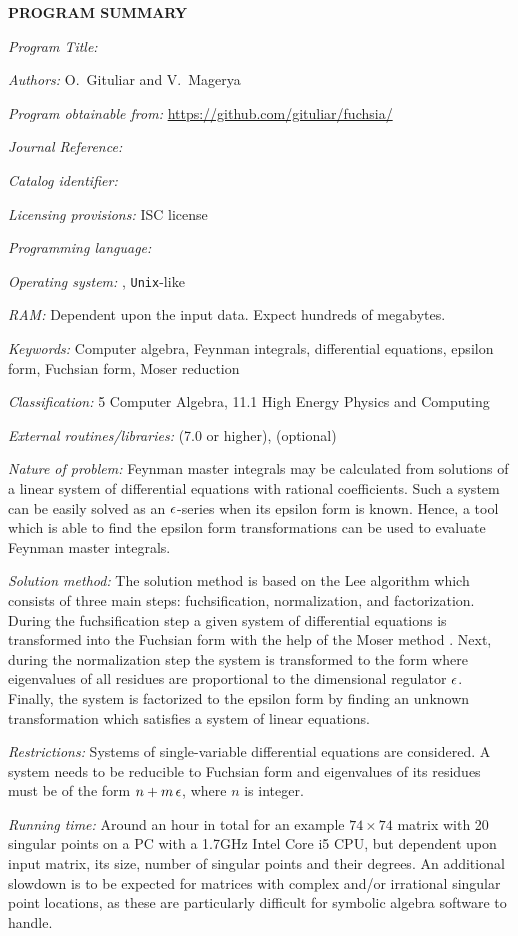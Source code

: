 {\bf PROGRAM SUMMARY}

\begin{small}
\noindent

{\em Program Title:}
    \fuchsia

{\em Authors:}
    O.~Gituliar and V.~Magerya

{\em Program obtainable from:}
    \url{https://github.com/gituliar/fuchsia/}

{\em Journal Reference:}

{\em Catalog identifier:}

{\em Licensing provisions:}
    ISC license

{\em Programming language:}

{\em Operating system:}
    \linux, \texttt{Unix}-like

{\em RAM:}
    Dependent upon the input data. Expect hundreds of megabytes.

{\em Keywords:}
    Computer algebra, Feynman integrals, differential equations, epsilon form, Fuchsian form, Moser reduction

{\em Classification:}
    5 Computer Algebra, 11.1 High Energy Physics and Computing

{\em External routines/libraries:}
    \href{http://www.sagemath.org/}{\sage} (7.0 or higher), \maple (optional)

{\em Nature of problem:}
    Feynman master integrals may be calculated from solutions of a linear system of differential equations with rational coefficients.
    Such a system can be easily solved as an $\epsilon$-series when its epsilon form is known.
    Hence, a tool which is able to find the epsilon form transformations can be used to evaluate Feynman master integrals. 

{\em Solution method:}
    The solution method is based on the Lee algorithm \cite{Lee15} which consists of three main steps: fuchsification, normalization, and factorization.
    During the fuchsification step a given system of differential equations is transformed into the Fuchsian form with the help of the Moser method \cite{Mos59}.
    Next, during the normalization step the system is transformed to the form where eigenvalues of all residues are proportional to the dimensional regulator $\epsilon$.
    Finally, the system is factorized to the epsilon form by finding an unknown transformation which satisfies a system of linear equations.

{\em Restrictions:}
    Systems of single-variable differential equations are considered.
    A system needs to be reducible to Fuchsian form and eigenvalues of its residues must be of the form $n + m\,\epsilon$, where $n$ is integer.

{\em Running time:}
    Around an hour in total for an example $74\times74$ matrix with 20 singular points on a PC with a 1.7GHz Intel Core i5 CPU, but dependent upon input matrix, its size, number of singular points and their degrees.
    An additional slowdown is to be expected for matrices with complex and/or irrational singular point locations, as these are particularly difficult for symbolic algebra software to handle.

\end{small}
